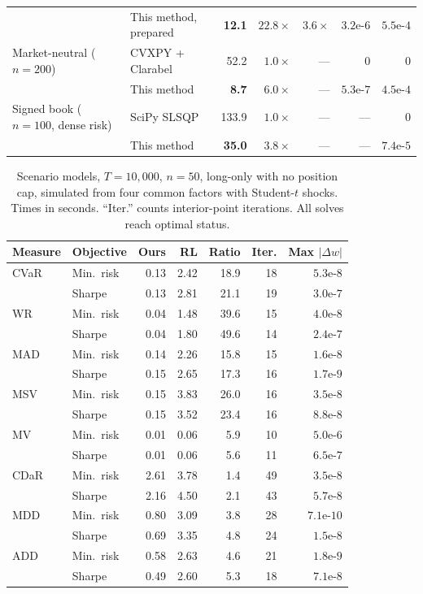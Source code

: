 \documentclass[10pt,twocolumn,letterpaper]{article}
\begin{document}
\begin{table}[t]
\begin{tabular}{llrrrrr}
& This method, prepared & \textbf{12.1} & $\mathbf{22.8\times}$ & $\mathbf{3.6\times}$ & $3.2\text{e-}6$ & $5.5\text{e-}4$ \\
\addlinespace[2pt]
Market-neutral ($n=200$) & CVXPY + Clarabel & 52.2 & $1.0\times$ & --- & $0$ & $0$ \\
& This method & \textbf{8.7} & $\mathbf{6.0\times}$ & --- & $5.3\text{e-}7$ & $4.5\text{e-}4$ \\
\addlinespace[2pt]
Signed book ($n=100$, dense risk) & SciPy SLSQP & 133.9 & $1.0\times$ & --- & --- & $0$ \\
& This method & \textbf{35.0} & $\mathbf{3.8\times}$ & --- & --- & $7.4\text{e-}5$ \\
\bottomrule
\end{tabular}
\end{table}

\begin{table}[h]
\centering
\caption{Scenario models, $T = 10{,}000$, $n = 50$, long-only with no position cap, simulated from four common factors with Student-$t$ shocks. Times in seconds. ``Iter.'' counts interior-point iterations. All solves reach optimal status.}
\label{tab:scen}
\footnotesize
\setlength{\tabcolsep}{3pt}
\begin{tabular}{llrrrrr}
\toprule
Measure & Objective & Ours & RL & Ratio & Iter. & Max $|\Delta w|$ \\
\midrule
CVaR & Min.\ risk & 0.13 & 2.42 & 18.9 & 18 & $5.3\text{e-8}$ \\
 & Sharpe & 0.13 & 2.81 & 21.1 & 19 & $3.0\text{e-7}$ \\
WR & Min.\ risk & 0.04 & 1.48 & 39.6 & 15 & $4.0\text{e-8}$ \\
 & Sharpe & 0.04 & 1.80 & 49.6 & 14 & $2.4\text{e-7}$ \\
MAD & Min.\ risk & 0.14 & 2.26 & 15.8 & 15 & $1.6\text{e-8}$ \\
 & Sharpe & 0.15 & 2.65 & 17.3 & 16 & $1.7\text{e-9}$ \\
MSV & Min.\ risk & 0.15 & 3.83 & 26.0 & 16 & $3.5\text{e-8}$ \\
 & Sharpe & 0.15 & 3.52 & 23.4 & 16 & $8.8\text{e-8}$ \\
MV & Min.\ risk & 0.01 & 0.06 & 5.9 & 10 & $5.0\text{e-6}$ \\
 & Sharpe & 0.01 & 0.06 & 5.6 & 11 & $6.5\text{e-7}$ \\
CDaR & Min.\ risk & 2.61 & 3.78 & 1.4 & 49 & $3.5\text{e-8}$ \\
 & Sharpe & 2.16 & 4.50 & 2.1 & 43 & $5.7\text{e-8}$ \\
MDD & Min.\ risk & 0.80 & 3.09 & 3.8 & 28 & $7.1\text{e-10}$ \\
 & Sharpe & 0.69 & 3.35 & 4.8 & 24 & $1.5\text{e-8}$ \\
ADD & Min.\ risk & 0.58 & 2.63 & 4.6 & 21 & $1.8\text{e-9}$ \\
 & Sharpe & 0.49 & 2.60 & 5.3 & 18 & $7.1\text{e-8}$ \\
\bottomrule
\end{tabular}
\end{table}
\end{document}
